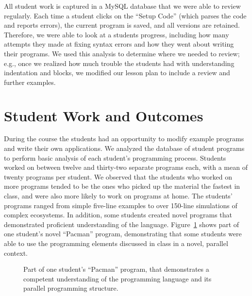 \documentclass{sig-alternate}
\newcommand{\INDSTATE}[1][1]{\STATE\hspace{#1\algorithmicindent}}
\begin{document}
All student work is captured in a MySQL database that we were able to review regularly.  Each time
a student clicks on the ``Setup Code'' (which parses the code and reports errors), the current
program is saved, and all versions are retained.  Therefore, we were able to look at a students 
progress, including how many attempts they made at fixing syntax errors and how they went about
writing their programs.  We used this analysis to determine where we needed to review; e.g.,
once we realized how much trouble the students had with understanding indentation and blocks, we
modified our lesson plan to include a review and further examples.

\section{Student Work and Outcomes}
During the course the students had an opportunity to modify example programs and write their own applications.  
We analyzed the database of student programs to perform basic analysis of each student's programming process.
Students worked on between twelve and thirty-two separate programs each, with a mean of twenty programs per student.  
We observed that the students who worked on more programs tended to be the ones who picked up
the material the fastest in class, and were also more likely to work on programs at home.  
The students' programs ranged from simple five-line examples to over 150-line simulations of complex ecosystems.
In addition, some students created novel programs that demonstrated proficient understanding of the language.  
Figure~\ref{fig:pacmanProgram} shows part of one student's novel ``Pacman'' program, 
demonstrating that some students were able to use the programming elements discussed in class
in a novel, parallel context.


\begin{figure}
\begin{algorithmic}[1]\sf
\setcounter{ALC@line}{22}
  \INDSTATE{for each pacman}
    \INDSTATE[2]{do in any order}
      \INDSTATE[3]{move the pacman's position a random number between 10 and 50 right}
      \INDSTATE[3]{move the pacman's position a random number between 10 and 50 left}
      \INDSTATE[3]{move the pacman's position a random number between 10 and 50 up}
      \INDSTATE[3]{move the pacman's position a random number between 10 and 50 down}
\STATE
{}
  \INDSTATE{destroy the pacman}
\end{algorithmic} 
\caption{Part of one student's ``Pacman'' program, that demonstrates a competent understanding
of the programming language and its parallel programming structure.}
\label{fig:pacmanProgram} 
\end{figure}
\end{document}
